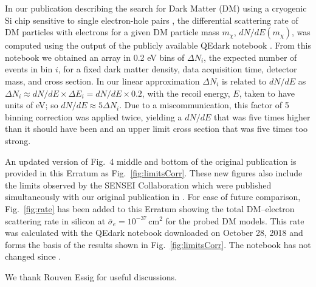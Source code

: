\documentclass[%
reprint,
superscriptaddress,
preprintnumbers,
amsmath,amssymb,
prl,
aps,
floatfix
]{revtex4-1}
\begin{document}
In our publication describing the search for Dark Matter (DM) using a cryogenic Si chip sensitive to single electron-hole pairs \cite{HVeV}, the differential scattering rate of DM particles with electrons for a given DM particle mass $m_{\chi}$, $dN/dE(m_{\chi})$, was computed using the output of the publicly available QEdark notebook \cite{qedark}. From this notebook we obtained an array in 0.2 eV bins of $\Delta N_i$, the expected number of events in bin $i$, for a fixed dark matter density, data acquisition time, detector mass, and cross section. In our linear approximation $\Delta N_i $ is related to $dN/dE$ as $\Delta N_i \approx dN/dE \times \Delta E_i = dN/dE \times 0.2$, with the recoil energy, $E$, taken to have units of eV; so $dN/dE \approx 5\Delta N_i$. Due to a miscommunication, this factor of 5 binning correction was applied twice, yielding a $dN/dE$ that was five times higher than it should have been and an upper limit cross section that was five times too strong. 

An updated version of Fig.~4 middle and bottom of the original publication is provided in this Erratum as Fig.~\ref{fig:limitsCorr}. These new figures also include the limits observed by the SENSEI Collaboration which were published simultaneously with our original publication in \cite{SENSEI}. For ease of future comparison, Fig.~\ref{fig:rate} has been added to this Erratum showing the total DM--electron scattering rate in silicon at $\bar{\sigma}_e=10^{-37}$\,cm$^2$ for the probed DM models. This rate was calculated with the QEdark notebook downloaded on October 28, 2018 and forms the basis of the results shown in Fig.~\ref{fig:limitsCorr}. The notebook has not changed since \cite{HVeV}.

\vspace{0.5cm}

\begin{acknowledgements}
We thank Rouven Essig for useful discussions.
\end{acknowledgements}

\clearpage
\end{document}
